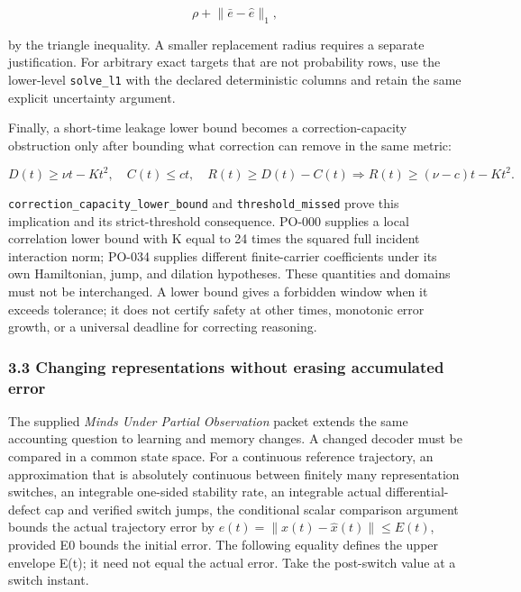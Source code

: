 \documentclass[
  10pt,
]{article}
\begin{document}
\protect\hypertarget{math-E0035-0040}{}{\[
\rho+\lVert\bar e-\widehat e\rVert_1,
\]}

by the triangle inequality. A smaller replacement radius requires a separate justification. For arbitrary exact targets that are not probability rows, use the lower-level \texttt{solve\_l1} with the declared deterministic columns and retain the same explicit uncertainty argument.

Finally, a short-time leakage lower bound becomes a correction-capacity obstruction only after bounding what correction can remove in the same metric:

\protect\hypertarget{math-E0029-0041}{}{\[
D(t)\ge\nu t-Kt^2,\quad
C(t)\le ct,\quad R(t)\ge D(t)-C(t)
\Longrightarrow R(t)\ge(\nu-c)t-Kt^2.
\]}

\texttt{correction\_capacity\_lower\_bound} and \texttt{threshold\_missed} prove this implication and its strict-threshold consequence. PO-000 supplies a local correlation lower bound with K equal to 24 times the squared full incident interaction norm; PO-034 supplies different finite-carrier coefficients under its own Hamiltonian, jump, and dilation hypotheses. These quantities and domains must not be interchanged. A lower bound gives a forbidden window when it exceeds tolerance; it does not certify safety at other times, monotonic error growth, or a universal deadline for correcting reasoning.

\subsubsection{3.3 Changing representations without erasing accumulated error}\label{changing-representations-without-erasing-accumulated-error}

The supplied \emph{Minds Under Partial Observation} packet extends the same accounting question to learning and memory changes. A changed decoder must be compared in a common state space. For a continuous reference trajectory, an approximation that is absolutely continuous between finitely many representation switches, an integrable one-sided stability rate, an integrable actual differential-defect cap and verified switch jumps, the conditional scalar comparison argument bounds the actual trajectory error by \protect\hypertarget{math-E0043-0042}{}{\(e(t)=\lVert x(t)-\widehat x(t)\rVert\le E(t)\)}, provided E0 bounds the initial error. The following equality defines the upper envelope E(t); it need not equal the actual error. Take the post-switch value at a switch instant.
\end{document}
